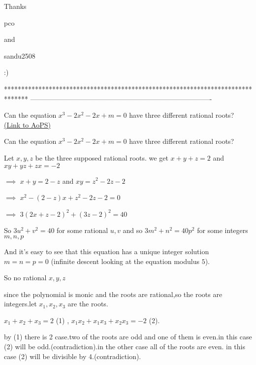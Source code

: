 \begin{solution}
	Thanks \begin{bolded}pco\end{bolded} and \begin{bolded}sandu2508\end{bolded} :)
\end{solution}
*******************************************************************************
-------------------------------------------------------------------------------

\begin{problem}
	Can the equation $x^3-2x^2-2x+m = 0$ have three different rational roots?
	\flushright \href{https://artofproblemsolving.com/community/c6h397152}{(Link to AoPS)}
\end{problem}



\begin{solution}
	\begin{tcolorbox}Can the equation $x^3-2x^2-2x+m = 0$ have three different rational roots?\end{tcolorbox}
Let $x,y,z$ be the three supposed rational roots. we get  $x+y+z=2$ and $xy+yz+zx=-2$

$\implies$ $x+y=2-z$ and $xy=z^2-2z-2$ 

$\implies$ $x^2-(2-z)x+z^2-2z-2=0$ 

$\implies$ $3(2x+z-2)^2+(3z-2)^2=40$

So $3u^2+v^2=40$ for some rational $u,v$ and so $3m^2+n^2=40p^2$ for some integers $m,n,p$

And it's easy to see that this equation has a unique integer solution $m=n=p=0$ (infinite descent looking at the equation  modulus $5$).

So no rational $x,y,z$
\end{solution}



\begin{solution}
	since the polynomial is monic and the roots are rational,so the roots are integers.let $x_1,x_2,x_3$ are the roots.

$x_1+x_2+x_3=2$ (1) , $x_1x_2+x_1x_3+x_2x_3=-2$ (2).

by (1) there is 2 case.two of the roots are odd and one of them is even.in this case (2) will be odd.(contradiction).in the other case all of the roots are even.
in this case (2) will be divisible by 4.(contradiction).
\end{solution}



